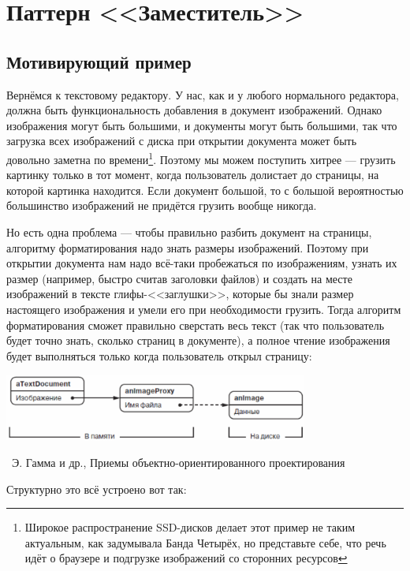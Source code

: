 \documentclass[a5paper]{article}
\newcommand{\attribution}[1] {
    \vspace{-5mm}\begin{flushright}\begin{scriptsize}%
    {\textcopyright\, #1}\end{scriptsize}\end{flushright}
}
\begin{document}
\section{Паттерн <<Заместитель>>}

\subsection{Мотивирующий пример}

Вернёмся к текстовому редактору. У нас, как и у любого нормального редактора, должна быть функциональность добавления в документ изображений. Однако изображения могут быть большими, и документы могут быть большими, так что загрузка всех изображений с диска при открытии документа может быть довольно заметна по времени\footnote{Широкое распространение SSD-дисков делает этот пример не таким актуальным, как задумывала Банда Четырёх, но представьте себе, что речь идёт о браузере и подгрузке изображений со сторонних ресурсов}. Поэтому мы можем поступить хитрее --- грузить картинку только в тот момент, когда пользователь долистает до страницы, на которой картинка находится. Если документ большой, то с большой вероятностью большинство изображений не придётся грузить вообще никогда.

Но есть одна проблема --- чтобы правильно разбить документ на страницы, алгоритму форматирования надо знать размеры изображений. Поэтому при открытии документа нам надо всё-таки пробежаться по изображениям, узнать их размер (например, быстро считав заголовки файлов) и создать на месте изображений в тексте глифы-<<заглушки>>, которые бы знали размер настоящего изображения и умели его при необходимости грузить. Тогда алгоритм форматирования сможет правильно сверстать весь текст (так что пользователь будет точно знать, сколько страниц в документе), а полное чтение изображения будет выполняться только когда пользователь открыл страницу:

\begin{center}
    \includegraphics[width=0.75\textwidth]{proxyExample.png}
    \attribution{Э. Гамма и др., Приемы объектно-ориентированного проектирования}
\end{center}

Структурно это всё устроено вот так:
\end{document}
